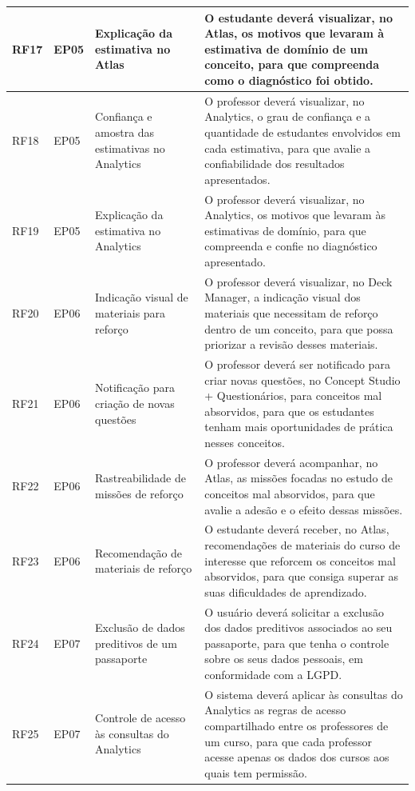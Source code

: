 {\begin{longtable}{>{\raggedright\arraybackslash}p{1.4cm}>{\raggedright\arraybackslash}p{2.0cm}>{\raggedright\arraybackslash}p{3.4cm}>{\raggedright\arraybackslash}p{7.0cm}}
\hline
RF17 & EP05 & Explicação da estimativa no Atlas & O estudante deverá visualizar, no Atlas, os motivos que levaram à estimativa de domínio de um conceito, para que compreenda como o diagnóstico foi obtido. \\
\hline
RF18 & EP05 & Confiança e amostra das estimativas no Analytics & O professor deverá visualizar, no Analytics, o grau de confiança e a quantidade de estudantes envolvidos em cada estimativa, para que avalie a confiabilidade dos resultados apresentados. \\
\hline
RF19 & EP05 & Explicação da estimativa no Analytics & O professor deverá visualizar, no Analytics, os motivos que levaram às estimativas de domínio, para que compreenda e confie no diagnóstico apresentado. \\
\hline
RF20 & EP06 & Indicação visual de materiais para reforço & O professor deverá visualizar, no Deck Manager, a indicação visual dos materiais que necessitam de reforço dentro de um conceito, para que possa priorizar a revisão desses materiais. \\
\hline
RF21 & EP06 & Notificação para criação de novas questões & O professor deverá ser notificado para criar novas questões, no Concept Studio + Questionários, para conceitos mal absorvidos, para que os estudantes tenham mais oportunidades de prática nesses conceitos. \\
\hline
RF22 & EP06 & Rastreabilidade de missões de reforço & O professor deverá acompanhar, no Atlas, as missões focadas no estudo de conceitos mal absorvidos, para que avalie a adesão e o efeito dessas missões. \\
\hline
RF23 & EP06 & Recomendação de materiais de reforço & O estudante deverá receber, no Atlas, recomendações de materiais do curso de interesse que reforcem os conceitos mal absorvidos, para que consiga superar as suas dificuldades de aprendizado. \\
\hline
RF24 & EP07 & Exclusão de dados preditivos de um passaporte & O usuário deverá solicitar a exclusão dos dados preditivos associados ao seu passaporte, para que tenha o controle sobre os seus dados pessoais, em conformidade com a LGPD. \\
\hline
RF25 & EP07 & Controle de acesso às consultas do Analytics & O sistema deverá aplicar às consultas do Analytics as regras de acesso compartilhado entre os professores de um curso, para que cada professor acesse apenas os dados dos cursos aos quais tem permissão. \\
\hline
\end{longtable}
}

